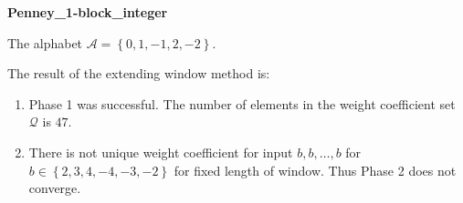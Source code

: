 \begin{exmp}
\textbf{ Penney\_1-block\_integer }

\label{ex:Penney1-blockinteger}

The alphabet $\mathcal{A} =\left\{0, 1, -1, 2, -2\right\}$.

The result of the extending window method is:
\begin{enumerate}
    \item Phase 1 was successful.
The number of elements in the weight coefficient set $\mathcal{Q}$ is $47$.

    \item There is not unique weight coefficient for input $b,b,\dots,b$ for $b\in\left\{2, 3, 4, -4, -3, -2\right\}$ for fixed length of window. Thus Phase 2 does not converge.

\end{enumerate}
\end{exmp}
